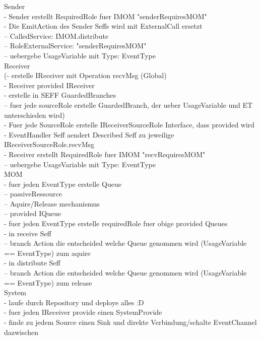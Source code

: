 Sender\\
- Sender erstellt RequiredRole fuer IMOM "senderRequiresMOM"\\
- Die EmitAction des Sender Seffs wird mit ExternalCall ersetzt\\
-- CalledService: IMOM.distribute\\
-- RoleExternalService: "senderRequiresMOM"\\
-- uebergebe UsageVariable mit Type: EventType\\

Receiver\\
(- erstelle IReceiver mit Operation recvMsg (Global)\\
- Receiver provided IReceiver\\
- erstelle in SEFF GuardedBranches\\
-- fuer jede sourceRole erstelle GuardedBranch, der ueber UsageVariable und ET unterschieden wird)\\

- Fuer jede SourceRole erstelle IReceiverSourceRole Interface, dass provided wird\\
- EventHandler Seff aendert Described Seff zu jeweilige IReceiverSourceRole.recvMsg\\
- Receiver erstellt RequiredRole fuer IMOM "recvRequiresMOM"\\
-- uebergebe UsageVariable mit Type: EventType\\

MOM\\
- fuer jeden EventType erstelle Queue\\
-- passiveRessource \\
-- Aquire/Release mechanismus\\
-- provided IQueue\\

- fuer jeden EventType erstelle requiredRole fuer obige provided Queues\\
- in receive Seff\\
-- branch Action die entscheided welche Queue genommen wird (UsageVariable == EventType) zum aquire\\

- in distribute Seff\\
-- branch Action die entscheided welche Queue genommen wird (UsageVariable == EventType) zum release\\

System\\
- laufe durch Repository und deploye alles :D\\
- fuer jeden IReceiver provide einen SystemProvide\\
- finde zu jedem Source einen Sink und direkte Verbindung/schalte EventChannel dazwischen\\


